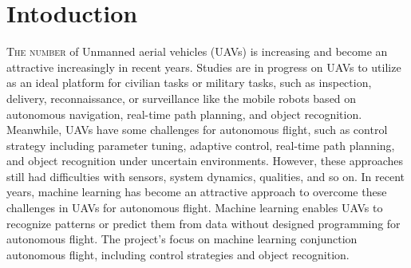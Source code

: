 \chapter{Intoduction}
\label{chap:introduction}
%
\lettrine[lines=3]{T}{he number} of Unmanned aerial vehicles (UAVs) is 
increasing and become an attractive increasingly in recent 
years.\cite{Boucher:2015aa,daponte2017measurement} 
Studies are in progress on UAVs to utilize as an ideal platform for civilian
tasks or military tasks, such as inspection, delivery, reconnaissance, or
surveillance like the mobile robots based on autonomous navigation, real-time
path planning, and object recognition.\cite{Wang_2018, zhang2016deep}
Meanwhile, UAVs have some challenges for autonomous flight, such as control
strategy including parameter tuning, adaptive control, real-time path planning,
and object recognition under uncertain environments. 
However, these approaches still had difficulties with sensors, system dynamics,
qualities, and so on. 
In recent years, machine learning has become an attractive approach to overcome
these challenges in UAVs for autonomous flight. Machine learning enables UAVs to
recognize patterns or predict them from data without designed programming for
autonomous flight.\cite{advancerobotics2019}
The project's focus on machine learning conjunction autonomous flight, including
control strategies and object recognition.
%
%
